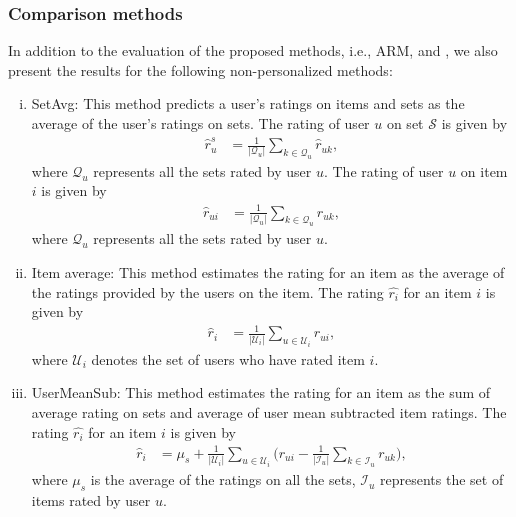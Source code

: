 \subsubsection{Comparison methods}\label{ch:lfs:comp_methods}
In addition to the evaluation of the proposed methods, i.e., ARM, \ES 
and \VO, we also present the results for the following non-personalized
methods:
\begin{enumerate}[(i)]
  \item SetAvg: This method predicts a user's ratings on items and sets as the average of the
    user's ratings on sets. The rating of user $u$ on set $\mathcal{S}$ is given
    by
    \begin{equation}
      \begin{split}
        \hat{r}_{u}^s &= \frac{1}{|\mathcal{Q}_u|} \sum_{k \in \mathcal{Q}_u} \hat{r}_{uk}, 
      \end{split}
    \end{equation}
  \noindent where $\mathcal{Q}_u$ represents all the sets rated by user $u$. The
  rating of user $u$ on item $i$ is given by
  \begin{equation}
    \begin{split}
      \hat{r}_{ui} &= \frac{1}{|\mathcal{Q}_u|} \sum_{k \in \mathcal{Q}_u}
      \hat{r}_{uk},
    \end{split}
  \end{equation}
\noindent where $\mathcal{Q}_u$ represents all the sets rated by user $u$.

  \item Item average: This method estimates the rating for an item as the average of the ratings
provided by the users on the item. The rating
$\hat{r_i}$ for an item $i$ is given by
\begin{equation}
  \begin{split}
    \hat{r}_{i} &= \frac{1}{|\mathcal{U}_i|}\sum_{u \in \mathcal{U}_i} r_{ui}, 
  \end{split}
\end{equation}
\noindent where $\mathcal{U}_i$ denotes the set of users who have rated item
$i$. 
 

  \item UserMeanSub: This method estimates the rating for an item as the sum of average rating on
sets and average of user mean subtracted item ratings.
The rating
$\hat{r_i}$ for an item $i$ is given by
\begin{equation}
  \begin{split}
    \hat{r}_{i} &= \mu_s + \frac{1}{|\mathcal{U}_i|}\sum_{u \in \mathcal{U}_i}
    \big(r_{ui} - \frac{1}{|\mathcal{I}_u|}\sum_{k \in \mathcal{I}_u}r_{uk}\big),
  \end{split}
\end{equation} 
\noindent where $\mu_s$ is the average of the ratings on all the sets, $\mathcal{I}_u$
represents the set of items rated by user $u$.

\end{enumerate}

